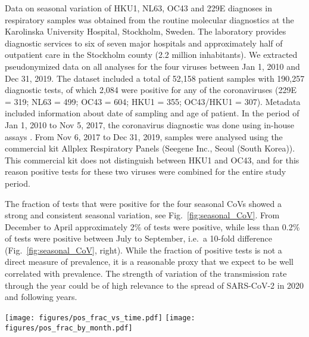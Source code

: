 \documentclass[rmp, reprint, superscriptaddress, floatfix,amsmath]{revtex4-1}
\newcommand{\Jan}[1]{{\color{deepsaffron}Jan: #1}}
\newcommand{\Emma}[1]{{\color{purple}Emma: #1}}
\begin{document}
Data on seasonal variation of HKU1, NL63, OC43 and 229E diagnoses in respiratory samples was obtained from the routine molecular diagnostics at the Karolinska University Hospital, Stockholm, Sweden. The laboratory provides diagnostic services to six of seven major hospitals and approximately half of outpatient care in the Stockholm county (2.2 million inhabitants). We extracted pseudonymized data on all analyses for the four viruses between Jan 1, 2010 and Dec 31, 2019. The dataset included a total of 52,158 patient samples with 190,257 diagnostic tests, of which 2,084 were positive for any of the coronaviruses (229E = 319; NL63 = 499; OC43 = 604; HKU1 = 355; OC43/HKU1 = 307). Metadata included information about date of sampling and age of patient. 
In the period of Jan 1, 2010 to Nov 5, 2017, the coronavirus diagnostic was done using in-house assays \citep{tiveljung2009development}. From Nov 6, 2017 to Dec 31, 2019, samples were analysed using the commercial kit Allplex Respiratory Panels (Seegene Inc., Seoul (South Korea)). This commercial kit does not distinguish between HKU1 and OC43, and for this reason positive tests for these two viruses were combined for the entire study period. 

The fraction of tests that were positive for the four seasonal CoVs showed a strong and consistent seasonal variation, see Fig.~\ref{fig:seasonal_CoV}. 
From December to April approximately 2\%  of tests were positive, while less than 0.2\% of tests were positive between July to September, i.e.~a 10-fold difference (Fig.~\ref{fig:seasonal_CoV}, right).
While the fraction of positive tests is not a direct measure of prevalence, it is a reasonable proxy that we expect to be well correlated with prevalence. 
The strength of variation of the transmission rate through the year could be of high relevance to the spread of SARS-CoV-2 in 2020 and following years. 

\begin{figure*}
    \centering
    \texttt{[image: figures/pos\_frac\_vs\_time.pdf]}
    \texttt{[image: figures/pos\_frac\_by\_month.pdf]}
    \caption{{\bf Seasonal variation in the fraction of positive CoV tests in Stockholm, Sweden.} The left panel shows test results between 2010 and 2019. The right panel shows aggregated data for all years. All CoVs show a marked decline in summer and autumn, with HKU1/OC43 peaking January--December, and NL63 and 229E peaking in February--March. %
    }
    \label{fig:seasonal_CoV}
\end{figure*}
\end{document}
